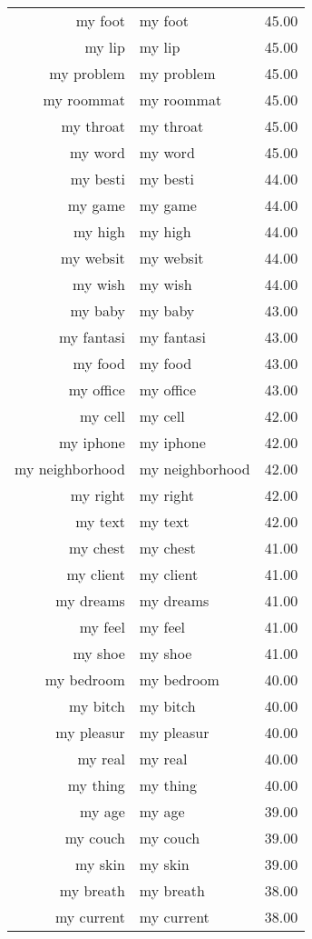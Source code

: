 \begin{table}[ht]
\begin{tabular}{rlr}
  my foot & my foot & 45.00 \\ 
  my lip & my lip & 45.00 \\ 
  my problem & my problem & 45.00 \\ 
  my roommat & my roommat & 45.00 \\ 
  my throat & my throat & 45.00 \\ 
  my word & my word & 45.00 \\ 
  my besti & my besti & 44.00 \\ 
  my game & my game & 44.00 \\ 
  my high & my high & 44.00 \\ 
  my websit & my websit & 44.00 \\ 
  my wish & my wish & 44.00 \\ 
  my baby & my baby & 43.00 \\ 
  my fantasi & my fantasi & 43.00 \\ 
  my food & my food & 43.00 \\ 
  my office & my office & 43.00 \\ 
  my cell & my cell & 42.00 \\ 
  my iphone & my iphone & 42.00 \\ 
  my neighborhood & my neighborhood & 42.00 \\ 
  my right & my right & 42.00 \\ 
  my text & my text & 42.00 \\ 
  my chest & my chest & 41.00 \\ 
  my client & my client & 41.00 \\ 
  my dreams & my dreams & 41.00 \\ 
  my feel & my feel & 41.00 \\ 
  my shoe & my shoe & 41.00 \\ 
  my bedroom & my bedroom & 40.00 \\ 
  my bitch & my bitch & 40.00 \\ 
  my pleasur & my pleasur & 40.00 \\ 
  my real & my real & 40.00 \\ 
  my thing & my thing & 40.00 \\ 
  my age & my age & 39.00 \\ 
  my couch & my couch & 39.00 \\ 
  my skin & my skin & 39.00 \\ 
  my breath & my breath & 38.00 \\ 
  my current & my current & 38.00 \\ 

\end{tabular}
\end{table}
